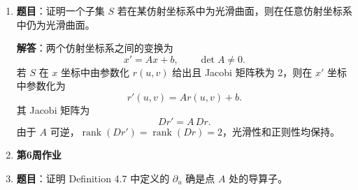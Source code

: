 \documentclass[UTF8,12pt,a4paper]{ctexart}
\newcommand{\rank}{\operatorname{rank}}
\newcommand{\homeworkweek}[1]{%
  \item[]\vspace{0.35em}\noindent\textbf{\large #1}\vspace{0.15em}
}
\begin{document}
\begin{enumerate}
再由自然标架
\[
\partial_r
=
(\sin\theta\cos\varphi,\,
\sin\theta\sin\varphi,\,
\cos\theta),
\]
\[
\partial_\theta
=
(r\cos\theta\cos\varphi,\,
r\cos\theta\sin\varphi,\,
-r\sin\theta),
\]
\[
\partial_\varphi
=
(-r\sin\theta\sin\varphi,\,
r\sin\theta\cos\varphi,\,
0)
\]
可知三个方向两两正交，且
\[
|\partial_r|^2=1,\qquad
|\partial_\theta|^2=r^2,\qquad
|\partial_\varphi|^2=r^2\sin^2\theta.
\]
因此与 \(\partial_r,\partial_\theta,\partial_\varphi\) 对偶的自然余标架为
\[
\boxed{
	\begin{aligned}
		dr
		&=
		\sin\theta\cos\varphi\,dx_1
		+\sin\theta\sin\varphi\,dx_2
		+\cos\theta\,dx_3,\\[4pt]
		d\theta
		&=
		\frac{\cos\theta\cos\varphi}{r}\,dx_1
		+\frac{\cos\theta\sin\varphi}{r}\,dx_2
		-\frac{\sin\theta}{r}\,dx_3,\\[4pt]
		d\varphi
		&=
		-\frac{\sin\varphi}{r\sin\theta}\,dx_1
		+\frac{\cos\varphi}{r\sin\theta}\,dx_2.
	\end{aligned}
}
\]
其中 \(d\varphi\) 要求 \(\sin\theta\neq 0\)，这对应球坐标在 \(x_3\) 轴上的坐标奇性。

接下来计算欧氏度量。对坐标函数求微分：
\[
dx_1
=
\sin\theta\cos\varphi\,dr
+r\cos\theta\cos\varphi\,d\theta
-r\sin\theta\sin\varphi\,d\varphi,
\]
\[
dx_2
=
\sin\theta\sin\varphi\,dr
+r\cos\theta\sin\varphi\,d\theta
+r\sin\theta\cos\varphi\,d\varphi,
\]
\[
dx_3
=
\cos\theta\,dr
-r\sin\theta\,d\theta.
\]
欧氏度量为
\[
ds^2=dx_1^2+dx_2^2+dx_3^2.
\]
代入并化简得
\[
ds^2
=
dr^2+r^2d\theta^2+r^2\sin^2\theta\,d\varphi^2.
\]
因此
\[
\boxed{
	ds^2=dr^2+r^2d\theta^2+r^2\sin^2\theta\,d\varphi^2.
}
\]

换言之，球坐标下的度量矩阵为
\[
\boxed{
	(g_{ij})
	=
	\begin{pmatrix}
		1 & 0 & 0\\
		0 & r^2 & 0\\
		0 & 0 & r^2\sin^2\theta
	\end{pmatrix}.
}
\]

\item \textbf{题目}：证明一个子集 $S$ 若在某仿射坐标系中为光滑曲面，则在任意仿射坐标系中仍为光滑曲面。

\textbf{解答}：两个仿射坐标系之间的变换为
\[
x'=Ax+b,\qquad \det A\ne0.
\]
若 $S$ 在 $x$ 坐标中由参数化 $r(u,v)$ 给出且 Jacobi 矩阵秩为 2，则在 $x'$ 坐标中参数化为
\[
r'(u,v)=Ar(u,v)+b.
\]
其 Jacobi 矩阵为
\[
D r'=A\,D r.
\]
由于 $A$ 可逆，$\rank(D r')=\rank(D r)=2$，光滑性和正则性均保持。


\homeworkweek{第6周作业}
\item \textbf{题目}：证明 Definition 4.7 中定义的 $\partial_u$ 确是点 $A$ 处的导算子。


\end{enumerate}
\end{document}
